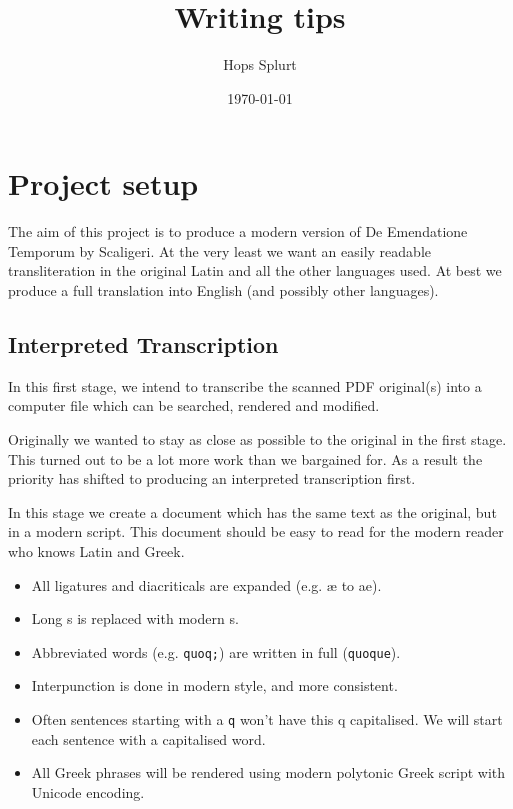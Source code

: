 \documentclass{report}
\title{Writing tips}
\author{Hops Splurt}
\date{\today}                                           %
\begin{document}
\maketitle

\tableofcontents{}




\chapter{Project setup}
The aim of this project is to produce a modern version of
De Emendatione Temporum by Scaligeri.
At the very least we want an easily readable transliteration
in the original Latin and all the other languages used.
At best we produce
a full translation into English (and possibly other languages).


\section{Interpreted Transcription}
In this first stage, we intend to transcribe the scanned PDF original(s)
into a computer file which can be searched, rendered
and modified.

Originally we wanted to stay as close as possible to the original
in the first stage.
This turned out to be a lot more work than we bargained for.
As a result the priority has shifted to producing
an interpreted transcription first.

In this stage we create a document which has the same text as the original,
but in a modern script.
This document should be easy to read for the modern reader who knows
Latin and Greek.

\begin{itemize}
\item All ligatures and diacriticals are expanded (e.g. æ to ae).
\item Long s is replaced with modern s.
\item Abbreviated words (e.g. \verb+quoq;+) are written in full (\verb+quoque+).
\item Interpunction is done in modern style, and more consistent.
\item Often sentences starting with a \verb+q+ won't have this q capitalised.
We will start each sentence with a capitalised word.
\item All Greek phrases will be rendered using modern polytonic Greek
script with Unicode encoding.
\end{itemize}
\end{document}
